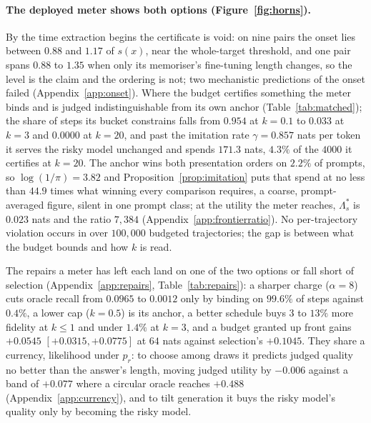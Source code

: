 \paragraph{The deployed meter shows both options (Figure~\ref{fig:horns}).} By the time extraction begins
the certificate is void: on nine pairs the onset lies between $0.88$ and $1.17$ of $s(x)$, near the
whole-target threshold, and one pair spans $0.88$ to $1.35$ when only its memoriser's fine-tuning length
changes, so the level is the claim and the ordering is not; two mechanistic predictions of the onset
failed (Appendix~\ref{app:onset}). Where the budget certifies something the meter binds and is
judged indistinguishable from its own anchor (Table~\ref{tab:matched}); the share of steps its bucket
constrains falls from $0.954$ at $k=0.1$ to $0.033$ at $k=3$ and $0.0000$ at $k=20$, and past the
imitation rate $\gamma = 0.857$ nats per token it serves the risky model unchanged and spends $171.3$ nats,
$4.3\%$ of the $4000$ it certifies at $k=20$. The anchor wins both presentation orders on $2.2\%$ of
prompts, so $\log(1/\pi) = 3.82$ and Proposition~\ref{prop:imitation} puts that spend at no less than $44.9$
times what winning every comparison requires, a coarse, prompt-averaged figure, silent in one prompt class;
at the utility the meter reaches, $\Lambda^*_s$ is $0.023$ nats and the ratio $7{,}384$
(Appendix~\ref{app:frontierratio}). No per-trajectory violation occurs in over $100{,}000$ budgeted
trajectories; the gap is between what the budget bounds and how $k$ is read.

The repairs a meter has left each land on one of the two options or fall short of selection
(Appendix~\ref{app:repairs}, Table~\ref{tab:repairs}): a sharper charge ($\alpha = 8$) cuts oracle recall
from $0.0965$ to $0.0012$ only by binding on $99.6\%$ of steps against $0.4\%$, a lower cap ($k=0.5$) is its
anchor, a better schedule buys $3$ to $13\%$ more fidelity at $k \le 1$ and under $1.4\%$ at $k=3$, and a
budget granted up front gains $+0.0545$ $[+0.0315, +0.0775]$ at $64$ nats against selection's $+0.1045$. They
share a currency, likelihood under $p_r$: to choose
among draws it predicts judged quality no better than the answer's length, moving judged utility
by $-0.006$ against a band of $+0.077$ where a circular oracle reaches $+0.488$
(Appendix~\ref{app:currency}), and to tilt generation it buys the risky model's quality only
by becoming the risky model.

